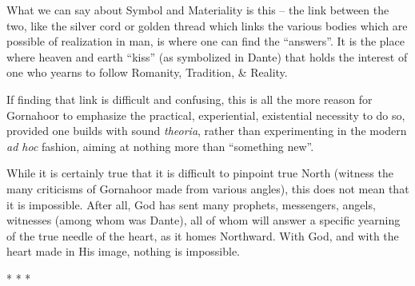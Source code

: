 What we can say about Symbol and Materiality is this -- the link between the two, like the silver cord or golden thread which links the various bodies which are possible of realization in man, is where one can find the ``answers''. It is the place where heaven and earth ``kiss'' (as symbolized in Dante) that holds the interest of one who yearns to follow Romanity, Tradition, \& Reality.

If finding that link is difficult and confusing, this is all the more reason for Gornahoor to emphasize the practical, experiential, existential necessity to do so, provided one builds with sound
\emph{theoria}, rather than experimenting in the modern \emph{ad hoc} fashion, aiming at nothing more than ``something new''.

While it is certainly true that it is difficult to pinpoint true North (witness the many criticisms of Gornahoor made from various angles), this does not mean that it is impossible. After all, God has sent many prophets, messengers, angels, witnesses (among whom was Dante), all of whom will answer a specific yearning of the true needle of the heart, as it homes Northward. With God, and with the heart made in His image, nothing is impossible.



\begin{center}* * *\end{center}

